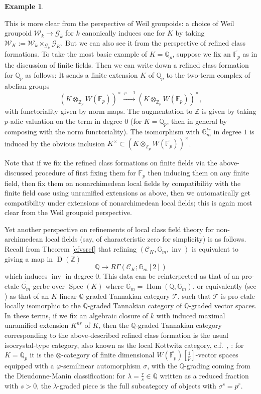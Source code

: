 \documentclass[12pt]{article}
\theoremstyle{definition}
\newtheorem{example}[theorem]{Example}
\newcommand{\on}{\operatorname}
\newcommand{\mc}{\mathcal}
\newcommand{\mbb}{\mathbb}
\newcommand{\ul}{\underline}
\begin{document}
\begin{example}
\begin{enumerate}
 This is more clear from the perspective of Weil groupoids: a choice of Weil groupoid $\mc{W}_k\to \mc{G}_k$ for $k$ canonically induces one for $K$ by taking $\mc{W}_K:= \mc{W}_k\times_{\mc{G}_k}\mc{G}_K$.  But we can also see it from the perspective of refined class formations.  To take the most basic example of $K=\mbb{Q}_p$, suppose we fix an $\overline{\mbb{F}_p}$ as in the discussion of finite fields.  Then we can write down a refined class formation for $\mbb{Q}_p$ as follows:  It sends a finite extension $K$ of $\mbb{Q}_p$ to the two-term complex of abelian groups
 $$(K\otimes_{\mbb{Z}_p}W(\overline{\mbb{F}_p}))^\times \overset{\varphi -1}{\longrightarrow} (K\otimes_{\mbb{Z}_p}W(\overline{\mbb{F}_p}))^\times,$$
 with functoriality given by norm maps.  The augmentation to $\mbb{Z}$ is given by taking $p$-adic valuation on the term in degree $0$ (for $K=\mbb{Q}_p$, then in general by composing with the norm functoriality).  The isomorphism with $\mbb{G}_m^{tr}$ in degree $1$ is induced by the obvious inclusion $K^\times\subset(K\otimes_{\mbb{Z}_p}W(\overline{\mbb{F}_p}))^\times$.

 Note that if we fix the refined class formations on finite fields via the above-discussed procedure of first fixing them for $\mbb{F}_p$ then inducing them on any finite field, then fix them on nonarchimedean local fields by compatibility with the finite field case using unramified extensions as above, then we automatically get compatibility under extensions of nonarchimedean local fields; this is again most clear from the Weil groupoid perspective.

Yet another perspective on refinements of local class field theory for non-archimedean local fields (say, of characteristic zero for simplicity) is as follows.  Recall from Theorem \ref{cfvsrcf} that refining $(\mc{C}_K,\mbb{G}_m,\on{inv})$ is equivalent to giving a map in $\on{D}(\mbb{Z})$
 $$\mbb{Q} \to R\Gamma(\mc{C}_K;\mbb{G}_m[2])$$
 which induces $\on{inv}$ in degree $0$.  This data can be reinterpreted as that of an pro-etale $\widetilde{\mbb{G}_m}$-gerbe over $\on{Spec}(K)$ where  $\widetilde{\mbb{G}_m}= \ul{\on{Hom}}(\mbb{Q},\mbb{G}_m)$, or equivalently (see \cite{tannakian}) as that of an $K$-linear $\mbb{Q}$-graded Tannakian category $\mc{T}$, such that $\mc{T}$ is pro-etale locally isomorphic to the $\mbb{Q}$-graded Tannakian category of $\mbb{Q}$-graded vector spaces.  In these terms, if we fix an algebraic closure of $k$ with induced maximal unramified extension $K^{nr}$ of $K$, then the $\mbb{Q}$-graded Tannakian category corresponding to the above-described refined class formation is the usual isocrystal-type category, also known as the local Kottwitz category, c.f.\ \cite{kottwitz}, \cite{iakovenko}: for $K=\mbb{Q}_p$ it is the $\otimes$-category of finite dimensional $W(\overline{\mbb{F}_p})[\frac{1}{p}]$-vector spaces equipped with a $\varphi$-semilinear automorphism $\sigma$, with the $\mbb{Q}$-grading coming from the Dieudonne-Manin classification: for $\lambda=\frac{r}{s}\in\mbb{Q}$ written as a reduced fraction with $s>0$, the $\lambda$-graded piece is the full subcategory of objects with $\sigma^s=p^r$.


\end{enumerate}
\end{example}
\end{document}
